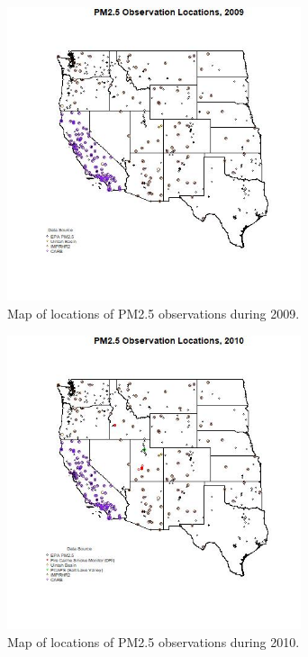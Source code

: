 \begin{figure} 
\centering 
\includegraphics[width=0.77\textwidth]{Code_Outputs/MapPM25_All_Sitesplot_year2009.jpg} 
\caption{\label{fig:MapPM25Loc2009}Map of locations of PM2.5 observations during 2009.} 
\end{figure} 
 

\begin{figure} 
\centering 
\includegraphics[width=0.77\textwidth]{Code_Outputs/MapPM25_All_Sitesplot_year2010.jpg} 
\caption{\label{fig:MapPM25Loc2010}Map of locations of PM2.5 observations during 2010.} 
\end{figure} 
 

